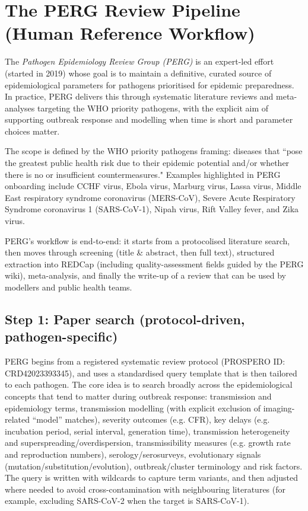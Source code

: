 \clearpage
\section{The PERG Review Pipeline (Human Reference Workflow)}
\label{app:perg_pipeline}

The \emph{Pathogen Epidemiology Review Group (PERG)} is an expert-led effort (started in 2019) whose goal is to maintain a definitive, curated source of epidemiological parameters for pathogens prioritised for epidemic preparedness. In practice, PERG delivers this through systematic literature reviews and meta-analyses targeting the WHO priority pathogens, with the explicit aim of supporting outbreak response and modelling when time is short and parameter choices matter. 

The scope is defined by the WHO priority pathogens framing: diseases that ``pose the greatest public health risk due to their epidemic potential and/or whether there is no or insufficient countermeasures." Examples highlighted in PERG onboarding include CCHF virus, Ebola virus, Marburg virus, Lassa virus, Middle East respiratory syndrome coronavirus (MERS-CoV), Severe Acute Respiratory Syndrome coronavirus 1 (SARS-CoV-1), Nipah virus, Rift Valley fever, and Zika virus. 

PERG’s workflow is end-to-end: it starts from a protocolised literature search, then moves through screening (title \& abstract, then full text), structured extraction into REDCap (including quality-assessment fields guided by the PERG wiki), meta-analysis, and finally the write-up of a review that can be used by modellers and public health teams. 

\subsection*{Step 1: Paper search (protocol-driven, pathogen-specific)}
PERG begins from a registered systematic review protocol (PROSPERO ID:  CRD42023393345), and uses a standardised query template that is then tailored to each pathogen. The core idea is to search broadly across the epidemiological concepts that tend to matter during outbreak response: transmission and epidemiology terms, transmission modelling (with explicit exclusion of imaging-related “model” matches), severity outcomes (e.g. CFR), key delays (e.g. incubation period, serial interval, generation time), transmission heterogeneity and superspreading/overdispersion, transmissibility measures (e.g. growth rate and reproduction numbers), serology/serosurveys, evolutionary signals (mutation/substitution/evolution), outbreak/cluster terminology and risk factors. The query is written with wildcards to capture term variants, and then adjusted where needed to avoid cross-contamination with neighbouring literatures (for example, excluding SARS-CoV-2 when the target is SARS-CoV-1).

